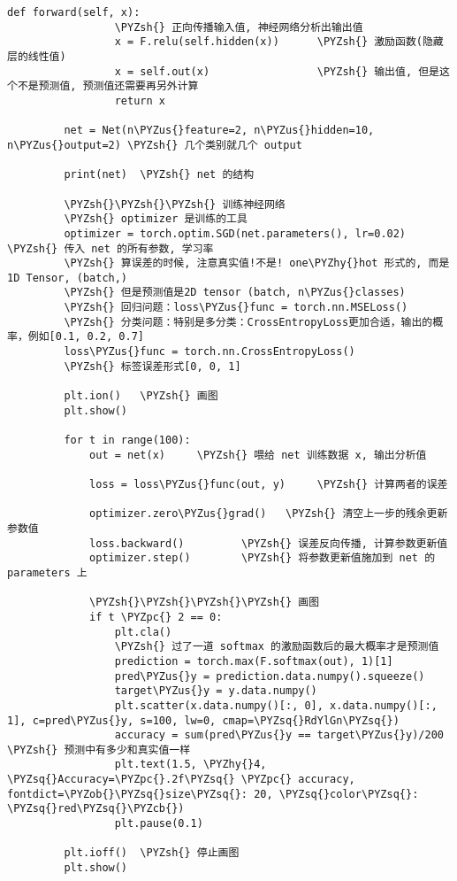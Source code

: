 \documentclass[11pt]{article}
\def\PYZsq{\textquotesingle}%
\def\PYZus{\char`\_}
\def\PYZob{\char`\{}
\def\PYZcb{\char`\}}
\def\PYZsh{\char`\#}
\def\PYZpc{\char`\%}
\def\PYZhy{\char`\-}
\def\PYZsq{\char`\'}
\begin{document}
\begin{Verbatim}[commandchars=\\\{\}]
             def forward(self, x):
                 \PYZsh{} 正向传播输入值, 神经网络分析出输出值
                 x = F.relu(self.hidden(x))      \PYZsh{} 激励函数(隐藏层的线性值)
                 x = self.out(x)                 \PYZsh{} 输出值, 但是这个不是预测值, 预测值还需要再另外计算
                 return x
         
         net = Net(n\PYZus{}feature=2, n\PYZus{}hidden=10, n\PYZus{}output=2) \PYZsh{} 几个类别就几个 output
         
         print(net)  \PYZsh{} net 的结构
         
         \PYZsh{}\PYZsh{}\PYZsh{} 训练神经网络
         \PYZsh{} optimizer 是训练的工具
         optimizer = torch.optim.SGD(net.parameters(), lr=0.02)  \PYZsh{} 传入 net 的所有参数, 学习率
         \PYZsh{} 算误差的时候, 注意真实值!不是! one\PYZhy{}hot 形式的, 而是1D Tensor, (batch,)
         \PYZsh{} 但是预测值是2D tensor (batch, n\PYZus{}classes)
         \PYZsh{} 回归问题：loss\PYZus{}func = torch.nn.MSELoss()
         \PYZsh{} 分类问题：特别是多分类：CrossEntropyLoss更加合适，输出的概率，例如[0.1, 0.2, 0.7]
         loss\PYZus{}func = torch.nn.CrossEntropyLoss()
         \PYZsh{} 标签误差形式[0, 0, 1]
         
         plt.ion()   \PYZsh{} 画图
         plt.show()
         
         for t in range(100):
             out = net(x)     \PYZsh{} 喂给 net 训练数据 x, 输出分析值
         
             loss = loss\PYZus{}func(out, y)     \PYZsh{} 计算两者的误差
         
             optimizer.zero\PYZus{}grad()   \PYZsh{} 清空上一步的残余更新参数值
             loss.backward()         \PYZsh{} 误差反向传播, 计算参数更新值
             optimizer.step()        \PYZsh{} 将参数更新值施加到 net 的 parameters 上
             
             \PYZsh{}\PYZsh{}\PYZsh{}\PYZsh{} 画图
             if t \PYZpc{} 2 == 0:
                 plt.cla()
                 \PYZsh{} 过了一道 softmax 的激励函数后的最大概率才是预测值
                 prediction = torch.max(F.softmax(out), 1)[1]
                 pred\PYZus{}y = prediction.data.numpy().squeeze()
                 target\PYZus{}y = y.data.numpy()
                 plt.scatter(x.data.numpy()[:, 0], x.data.numpy()[:, 1], c=pred\PYZus{}y, s=100, lw=0, cmap=\PYZsq{}RdYlGn\PYZsq{})
                 accuracy = sum(pred\PYZus{}y == target\PYZus{}y)/200  \PYZsh{} 预测中有多少和真实值一样
                 plt.text(1.5, \PYZhy{}4, \PYZsq{}Accuracy=\PYZpc{}.2f\PYZsq{} \PYZpc{} accuracy, fontdict=\PYZob{}\PYZsq{}size\PYZsq{}: 20, \PYZsq{}color\PYZsq{}:  \PYZsq{}red\PYZsq{}\PYZcb{})
                 plt.pause(0.1)
         
         plt.ioff()  \PYZsh{} 停止画图
         plt.show()
             
\end{Verbatim}
\end{document}
